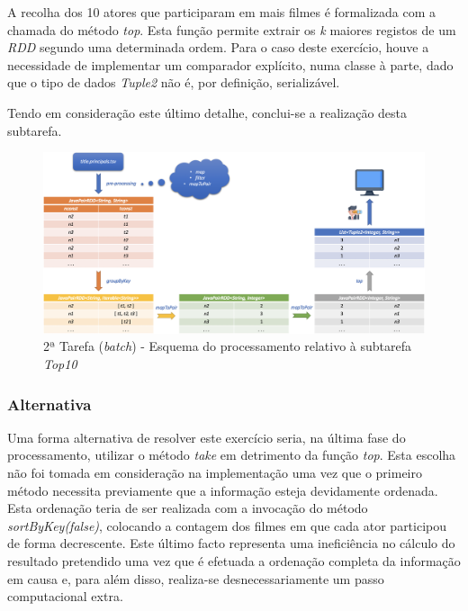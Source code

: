 \documentclass[a4paper]{report}
\begin{document}
            A recolha dos 10 atores que participaram em mais filmes é formalizada com a chamada do método \textit{top}. Esta função permite extrair os \textit{k} maiores registos de um \textit{RDD} segundo uma determinada ordem.
            Para o caso deste exercício, houve a necessidade de implementar um comparador explícito, numa classe à parte, dado que o tipo de dados \textit{Tuple2} não é, por definição, serializável.

            Tendo em consideração este último detalhe, conclui-se a realização desta subtarefa.

            \begin{figure}[H]
                \centering
                \includegraphics[width=1.0\textwidth]{Imagens/2ª Tarefa - Top10.png}
                \caption{2ª Tarefa (\textit{batch}) - Esquema do processamento relativo à subtarefa \textit{Top10}}
                \label{fig:13}
            \end{figure}

            \subsubsection{Alternativa} \label{sssec:Task2-Top10-Alternativa}
                Uma forma alternativa de resolver este exercício seria, na última fase do processamento, utilizar o método \textit{take} em detrimento da função \textit{top}.
                Esta escolha não foi tomada em consideração na implementação uma vez que o primeiro método necessita previamente que a informação esteja devidamente ordenada.
                Esta ordenação teria de ser realizada com a invocação do método \textit{sortByKey(false)}, colocando a contagem dos filmes em que cada ator participou de forma decrescente.
                Este último facto representa uma ineficiência no cálculo do resultado pretendido uma vez que é efetuada a ordenação completa da informação em causa e, para além disso, realiza-se desnecessariamente um passo computacional extra.
\end{document}
